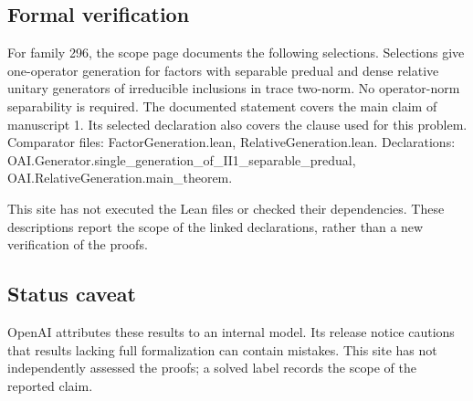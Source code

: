 \documentclass[11pt]{article}
\begin{document}
\subsection{Formal verification}
For family 296, the scope page documents the following selections. Selections give one-operator generation for factors with separable predual and dense relative unitary generators of irreducible inclusions in trace two-norm. No operator-norm separability is required. The documented statement covers the main claim of manuscript 1. Its selected declaration also covers the clause used for this problem. Comparator files: FactorGeneration.lean, RelativeGeneration.lean. Declarations: OAI.Generator.single\_generation\_of\_II1\_separable\_predual, OAI.RelativeGeneration.main\_theorem.

This site has not executed the Lean files or checked their dependencies. These descriptions report the scope of the linked declarations, rather than a new verification of the proofs.

\subsection{Status caveat}
OpenAI attributes these results to an internal model. Its release notice cautions that results lacking full formalization can contain mistakes. This site has not independently assessed the proofs; a solved label records the scope of the reported claim.
\end{document}
